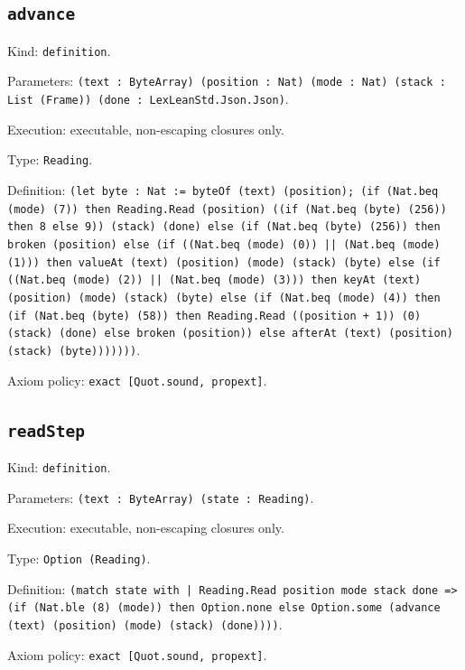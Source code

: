 \documentclass[11pt]{article}
\begin{document}
\subsection*{\texttt{advance}}
\noindent Kind: \texttt{definition}.\par
\noindent Parameters: \texttt{(text : ByteArray) (position : Nat) (mode : Nat) (stack : List (Frame)) (done : LexLeanStd.Json.Json)}.\par
\noindent Execution: executable, non-escaping closures only.\par
\noindent Type: \texttt{Reading}.\par
\noindent Definition: \texttt{(let byte : Nat := byteOf (text) (position); (if (Nat.beq (mode) (7)) then Reading.Read (position) ((if (Nat.beq (byte) (256)) then 8 else 9)) (stack) (done) else (if (Nat.beq (byte) (256)) then broken (position) else (if ((Nat.beq (mode) (0)) || (Nat.beq (mode) (1))) then valueAt (text) (position) (mode) (stack) (byte) else (if ((Nat.beq (mode) (2)) || (Nat.beq (mode) (3))) then keyAt (text) (position) (mode) (stack) (byte) else (if (Nat.beq (mode) (4)) then (if (Nat.beq (byte) (58)) then Reading.Read ((position + 1)) (0) (stack) (done) else broken (position)) else afterAt (text) (position) (stack) (byte)))))))}.\par
\noindent Axiom policy: \texttt{exact [Quot.sound, propext]}.\par
\subsection*{\texttt{readStep}}
\noindent Kind: \texttt{definition}.\par
\noindent Parameters: \texttt{(text : ByteArray) (state : Reading)}.\par
\noindent Execution: executable, non-escaping closures only.\par
\noindent Type: \texttt{Option (Reading)}.\par
\noindent Definition: \texttt{(match state with | Reading.Read position mode stack done => (if (Nat.ble (8) (mode)) then Option.none else Option.some (advance (text) (position) (mode) (stack) (done))))}.\par
\noindent Axiom policy: \texttt{exact [Quot.sound, propext]}.\par
\end{document}
